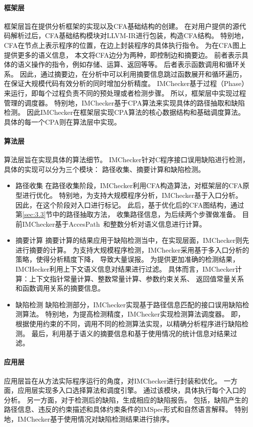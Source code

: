 \paragraph{框架层}
框架层旨在提供分析框架的实现以及CFA基础结构的创建。
在对用户提供的源代码解析过后，CFA基础结构模块对LLVM-IR进行包装，构造CFA结构。
特别地，CFA在节点上表示程序的位置，在边上封装程序的具体执行指令。
为在CFA图上提供更多的语义信息，
本文将CFA边分为两种，即控制边和摘要边。
前者表示具体的语义操作的指令，例如存储、运算、返回等等。
后者表示函数调用和循环关系。
因此，通过摘要边，在分析中可以利用摘要信息跳过函数展开和循环遍历，
在保证大规模代码有效分析的同时增加分析精度。
IMChecker基于过程（Phase）来运行，即每个过程负责不同的预处理或者检测步骤。
所以，框架层中实现过程管理的调度器。
特别地，IMChecker基于CPA算法来实现具体的路径抽取和缺陷检测。
因此IMChecker在框架层实现CPA算法的核心数据结构和基础调度算法。
具体的每一个CPA则在算法层中实现。

\paragraph{算法层}
算法层旨在实现具体的算法细节。
IMChecker针对C程序接口误用缺陷进行检测，具体的实现可以分为三个模块：
路径收集、摘要计算和缺陷检测。
\begin{itemize}
	\item {\kaishu 路径收集} 
	在路径收集阶段，IMChecker利用CFA构造算法，对框架层的CFA原型进行优化。
	特别地，为支持大规模程序分析，IMChecker基于入口分析。
	因此，在这个阶段对入口进行标记。
	此后，基于优化后的CFA图结构，通过第\ref{sec:3.3}节中的路径抽取方法，
	收集路径信息，为后续两个步骤做准备。
	目前IMChecker基于AccesPath~\cite{15-ase-accesspath}和整数分析对语义信息进行计算。
	\item {\kaishu 摘要计算} 
	摘要计算的结果应用于缺陷检测当中，在实现层面，IMChecker则先进行摘要的计算。
	为支持大规模程序检测，IMChecker采用基于多入口分析的策略，使得分析精度下降，
	导致大量误报。
	为提供更加准确的检测结果，IMCHecker利用上下文语义信息对结果进行过滤。
	具体而言，IMChecker计算：上下文指针常量计算、整数常量计算、参数约束关系、
	返回值常量关系和函数调用关系的摘要信息。
	\item {\kaishu 缺陷检测} 
	缺陷检测部分，IMChecker实现基于路径信息匹配的接口误用缺陷检测算法。
	特别地，为提高检测精度，IMChecker实现检测算法调度器。
	即，根据使用约束的不同，调用不同的检测算法实现，以精确分析程序进行缺陷检测。
	最后，利用基于语义的摘要信息和基于使用情况的统计信息对结果过滤。
\end{itemize}


\paragraph{应用层}
应用层旨在从方法实际程序运行的角度，对IMChecker进行封装和优化。
一方面，应用层实现多入口选择算法和调度引擎。
通过该模块，具体执行每个入口的分析。
另一方面，对于检测后的缺陷，生成相应的缺陷报告。
包括，缺陷产生的路径信息、违反的约束描述和具体约束条件的IMSpec形式和自然语言解释。
特别地，IMChecker基于使用情况对缺陷检测结果进行排序。

